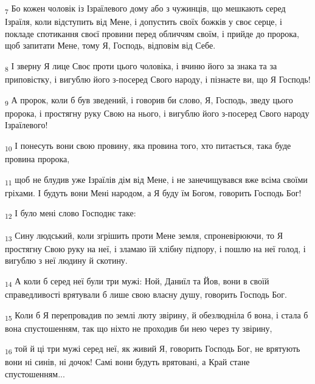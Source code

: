 \begin{tcolorbox}
\textsubscript{7} Бо кожен чоловік із Ізраїлевого дому або з чужинців, що мешкають серед Ізраїля, коли відступить від Мене, і допустить своїх божків у своє серце, і покладе спотикання своєї провини перед обличчям своїм, і прийде до пророка, щоб запитати Мене, тому Я, Господь, відповім від Себе.
\end{tcolorbox}
\begin{tcolorbox}
\textsubscript{8} І зверну Я лице Своє проти цього чоловіка, і вчиню його за знака та за приповістку, і вигублю його з-посеред Свого народу, і пізнаєте ви, що Я Господь!
\end{tcolorbox}
\begin{tcolorbox}
\textsubscript{9} А пророк, коли б був зведений, і говорив би слово, Я, Господь, зведу цього пророка, і простягну руку Свою на нього, і вигублю його з-посеред Свого народу Ізраїлевого!
\end{tcolorbox}
\begin{tcolorbox}
\textsubscript{10} І понесуть вони свою провину, яка провина того, хто питається, така буде провина пророка,
\end{tcolorbox}
\begin{tcolorbox}
\textsubscript{11} щоб не блудив уже Ізраїлів дім від Мене, і не занечищувався вже всіма своїми гріхами. І будуть вони Мені народом, а Я буду їм Богом, говорить Господь Бог!
\end{tcolorbox}
\begin{tcolorbox}
\textsubscript{12} І було мені слово Господнє таке:
\end{tcolorbox}
\begin{tcolorbox}
\textsubscript{13} Сину людський, коли згрішить проти Мене земля, спроневірюючи, то Я простягну Свою руку на неї, і зламаю їй хлібну підпору, і пошлю на неї голод, і вигублю з неї людину й скотину.
\end{tcolorbox}
\begin{tcolorbox}
\textsubscript{14} А коли б серед неї були три мужі: Ной, Даниїл та Йов, вони в своїй справедливості врятували б лише свою власну душу, говорить Господь Бог.
\end{tcolorbox}
\begin{tcolorbox}
\textsubscript{15} Коли б Я перепровадив по землі люту звірину, й обезлюдніла б вона, і стала б вона спустошенням, так що ніхто не проходив би нею через ту звірину,
\end{tcolorbox}
\begin{tcolorbox}
\textsubscript{16} той й ці три мужі серед неї, як живий Я, говорить Господь Бог, не врятують вони ні синів, ні дочок! Самі вони будуть врятовані, а Край стане спустошенням...
\end{tcolorbox}
